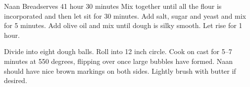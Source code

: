 \begin{recipe}{Naan Bread}{serves 4}{1 hour 30 minutes}
  Mix together until all the flour is incorporated and then let sit for 30 minutes.
  Add salt, sugar and yeast and mix for 5 minutes.
  Add olive oil and mix until dough is silky smooth.  Let rise for 1 hour.

  Divide into eight dough balls.  Roll into 12 inch circle.  Cook on cast for 5--7 minutes at 550 degrees, flipping over once large bubbles have formed.  Naan should have nice brown markings on both sides.  Lightly brush with butter if desired.
\end{recipe}
